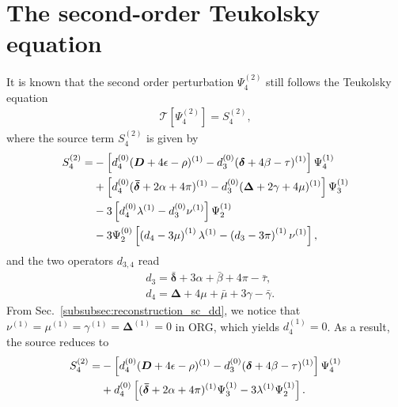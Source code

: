 \documentclass[aps,prd,amsmath,floats,floatfix, twocolumn,
superscriptaddress,nofootinbib,showpacs]{revtex4-1}
\begin{document}
\section{The second-order Teukolsky equation}
\label{sec:second_order_Teukolsky_equation}
It is known that the second order perturbation $\Psi_4^{(2)}$ still follows the Teukolsky equation \cite{Campanelli:1998jv}
\begin{align}
    \mathcal{T} \left[\Psi_4^{(2)}\right] = S_4^{(2)}, \label{eq:2nd_Teukolsky}
\end{align}
where the source term $S_4^{(2)}$ is given by
\begin{align}
    S_4^{(2)}=&-\left[d_4^{(0)}(\bm{D}+4\epsilon-\rho)^{(1)}-d_3^{(0)}(\bm{\delta}+4\beta-\tau)^{(1)}\right] \Psi_4^{(1)} \notag \\
    &+ \left[d_4^{(0)}(\bm{\bar{\delta}}+2\alpha+4\pi)^{(1)}-d_3^{(0)}(\bm{\Delta}+2\gamma+4\mu)^{(1)}\right] \Psi_3^{(1)} \notag \\
    & -3\left[d_4^{(0)}\lambda^{(1)}-d_3^{(0)}\nu^{(1)}\right]\Psi_2^{(1)}\notag \\
    &-3\Psi_2^{(0)}\left[\left(d_4-3\mu\right)^{(1)}\lambda^{(1)}-\left(d_3-3\pi\right)^{(1)}\nu^{(1)}\right],
\end{align} %
and the two operators $d_{3,4}$ read
\begin{subequations}
\begin{align}
    &d_3=\bm{\bar{\delta}}+3\alpha+\bar{\beta}+4\pi-\bar{\tau}, \\ 
    &d_4=\bm{\Delta}+4\mu+\bar{\mu}+3\gamma-\bar{\gamma}.
\end{align} 
\end{subequations}
From Sec.~\ref{subsubsec:reconstruction_sc_dd}, we notice that $\nu^{(1)}=\mu^{(1)}=\gamma^{(1)}=\bm{\Delta}^{(1)}=0$ in ORG, which yields $d_4^{(1)}=0$. As a result, the source reduces to
\begin{align}
    S_4^{(2)}=&-\left[d_4^{(0)}(\bm{D}+4\epsilon-\rho)^{(1)}-d_3^{(0)}(\bm{\delta}+4\beta-\tau)^{(1)}\right] \Psi_4^{(1)} \notag \\
    &+ d_4^{(0)}\left[(\bm{\bar{\delta}}+2\alpha+4\pi)^{(1)}\Psi_3^{(1)}-3\lambda^{(1)}\Psi_2^{(1)}\right]. \notag 
\end{align}
\end{document}
